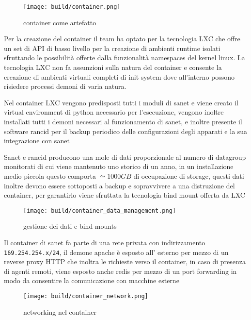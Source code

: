 \begin{figure}[H]
    \centering
    \texttt{[image: build/container.png]}
    \caption{container come artefatto}
    \label{fig:enter-label}
\end{figure}

Per la creazione del container il team ha optato per la tecnologia LXC\cite{lxc} che offre un set di API di basso livello per la creazione di ambienti runtime isolati sfruttando le possibilità offerte dalla funzionalità namespaces del kernel linux. La tecnologia LXC non fa assunzioni sulla natura del container e consente la creazione di ambienti virtuali completi di init system dove all'interno possono risiedere processi demoni di varia natura.

Nel container LXC vengono predisposti tutti i moduli di sanet e viene creato il virtual environment di python necessario per l'esecuzione, vengono inoltre installati tutti i demoni necessari al funzionamento di sanet, e inoltre presente il software rancid per il backup periodico delle configurazioni degli apparati e la sua integrazione con sanet

Sanet e rancid producono una mole di dati proporzionale al numero di datagroup monitorati di cui viene mantenuto uno storico di un anno, in un installazione medio piccola questo comporta \(\simeq 1000 GB\) di occupazione di storage, questi dati inoltre devono essere sottoposti a backup e sopravvivere a una distruzione del container, per garantirlo viene sfruttata la tecnologia bind mount offerta da LXC\cite{lxc}

\begin{figure}[H]
    \centering
    \texttt{[image: build/container\_data\_management.png]}
    \caption{gestione dei dati e bind mounts}
    \label{fig:enter-label}
\end{figure}

Il container di sanet fa parte di una rete privata con indirizzamento \verb|169.254.254.x/24|, il demone apache è esposto all' esterno per mezzo di un reverse proxy HTTP che inoltra le richieste verso il container, in caso di presenza di agenti remoti, viene esposto anche redis per mezzo di un port forwarding in modo da consentire la comunicazione con macchine esterne

\begin{figure}[H]
    \centering
    \texttt{[image: build/container\_network.png]}
    \caption{networking nel container}
    \label{fig:enter-label}
\end{figure}

